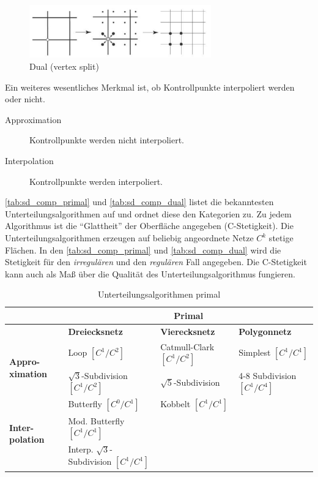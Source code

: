 \begin{figure}
  \centering
  \includegraphics[width=0.7\textwidth]{content/media/sd_dual}
  \caption{Dual (vertex split) \cite{Standford.24.07.2015}}
  \label{fig:sd_dual}
\end{figure}

Ein weiteres wesentliches Merkmal ist, ob Kontrollpunkte interpoliert werden oder nicht. 
\begin{description}
 \item[Approximation] Kontrollpunkte werden nicht interpoliert.
 \item[Interpolation] Kontrollpunkte werden interpoliert.
\end{description}

\autoref{tab:sd_comp_primal} und \autoref{tab:sd_comp_dual} listet die bekanntesten Unterteilungsalgorithmen auf und ordnet diese den Kategorien zu.
Zu jedem Algorithmus ist die \enquote{Glattheit} der Oberfläche angegeben (C-Stetigkeit).
Die Unterteilungsalgorithmen erzeugen auf beliebig angeordnete Netze \(C^k\) stetige Flächen.
In den \autoref{tab:sd_comp_primal} und \autoref{tab:sd_comp_dual} wird die Stetigkeit für den
\emph{irregulären} und den \emph{regulären} Fall angegeben.
Die C-Stetigkeit kann auch als Maß über die Qualität des Unterteilungsalgorithmus fungieren.
\cite{Zorin.subdivcourse}

\begin{table}
\center
\caption{Unterteilungsalgorithmen primal \cite[S. 65]{Zorin.subdivcourse}
\cite{Standford.24.07.2015} \cite{Kobbelt3} \cite{Velho:2001:SUB:2246196.2246206}
\cite{Peters:1997:SSS:263834.263851} \cite{Inter3Subdiv} \cite{Sqrt5}}
\label{tab:sd_comp_primal}
\begin{tabular}{p{1.5cm}|p{4cm}|p{4cm}|p{3cm}|}
& \multicolumn{3}{c|}{\textbf{Primal}}\\
\hline
& \textbf{Dreiecksnetz} & \textbf{Vierecksnetz} & \textbf{Polygonnetz}\\
\hline
\multirow{2}{1.5cm}{\textbf{Appro-ximation}} & Loop \([C^1/C^2]\) & Catmull-Clark \([C^1/C^2]\) & Simplest \([C^1/C^1]\)\\
 & \(\sqrt3\)-Subdivision \([C^1/C^2]\) & \(\sqrt5\)-Subdivision & 4-8 Subdivision \([C^1/C^4]\)\\
\hline
\multirow{3}{1.5cm}{\textbf{Inter-polation}} & Butterfly \([C^0/C^1]\) & Kobbelt \([C^1/C^1]\) & \\
 & Mod. Butterfly \([C^1/C^1]\) & &\\
 &Interp. \(\sqrt3\)-Subdivision \([C^1/C^1]\) & &\\
\end{tabular}
\end{table}

